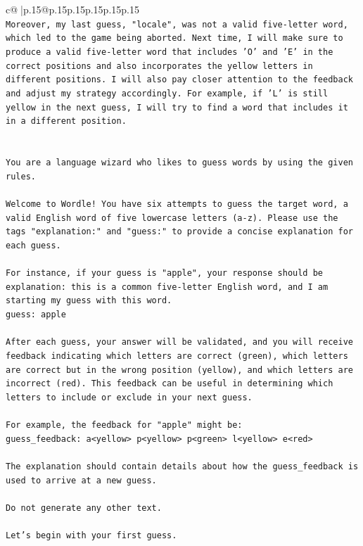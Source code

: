 \documentclass{article}
\begin{document}
{\begin{supertabular}{c@{$\;$}|p{.15\linewidth}@{}p{.15\linewidth}p{.15\linewidth}p{.15\linewidth}p{.15\linewidth}p{.15\linewidth}}
{{{\\ 
\texttt{Moreover, my last guess, "locale", was not a valid five{-}letter word, which led to the game being aborted. Next time, I will make sure to produce a valid five{-}letter word that includes 'O' and 'E' in the correct positions and also incorporates the yellow letters in different positions. I will also pay closer attention to the feedback and adjust my strategy accordingly. For example, if 'L' is still yellow in the next guess, I will try to find a word that includes it in a different position.} \\
\\ 
\\ 
\texttt{You are a language wizard who likes to guess words by using the given rules.} \\
\\ 
\texttt{Welcome to Wordle! You have six attempts to guess the target word, a valid English word of five lowercase letters (a{-}z). Please use the tags "explanation:" and "guess:" to provide a concise explanation for each guess.} \\
\\ 
\texttt{For instance, if your guess is "apple", your response should be} \\
\texttt{explanation: this is a common five{-}letter English word, and I am starting my guess with this word.} \\
\texttt{guess: apple} \\
\\ 
\texttt{After each guess, your answer will be validated, and you will receive feedback indicating which letters are correct (green), which letters are correct but in the wrong position (yellow), and which letters are incorrect (red). This feedback can be useful in determining which letters to include or exclude in your next guess.} \\
\\ 
\texttt{For example, the feedback for "apple" might be:} \\
\texttt{guess\_feedback: a<yellow> p<yellow> p<green> l<yellow> e<red>} \\
\\ 
\texttt{The explanation should contain details about how the guess\_feedback is used to arrive at a new guess.} \\
\\ 
\texttt{Do not generate any other text.} \\
\\ 
\texttt{Let's begin with your first guess.} \\
            }
        }
    }
     \\ \\


\end{supertabular}}
\end{document}
